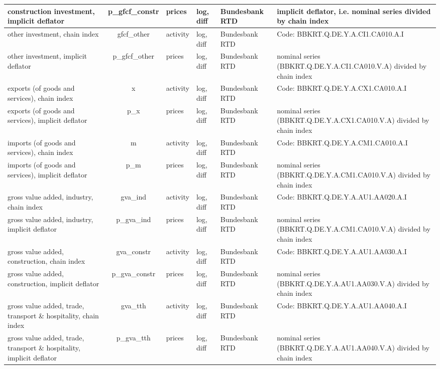 \documentclass[notitlepage,a4paper,12pt]{article}
\begin{document}
\begin{ThreePartTable}
\begin{landscape}
\begin{longtable}{| l | c | l | l | l | l |}
    construction investment, implicit deflator\tnote{s,c} & p\_gfcf\_constr & prices & log, diff  & Bundesbank RTD & implicit deflator, i.e. nominal series divided by chain index\\ \hline
    other investment, chain index\tnote{s,c} & gfcf\_other & activity & log, diff  & Bundesbank RTD & Code: BBKRT.Q.DE.Y.A.CI1.CA010.A.I\\ \hline
    other investment, implicit deflator\tnote{s,c} & p\_gfcf\_other & prices & log, diff  & Bundesbank RTD & nominal series (BBKRT.Q.DE.Y.A.CI1.CA010.V.A) divided by chain index\\ \hline
    exports (of goods and services), chain index\tnote{s,c} & x & activity & log, diff  & Bundesbank RTD & Code: BBKRT.Q.DE.Y.A.CX1.CA010.A.I\\ \hline
    exports (of goods and services), implicit deflator\tnote{s,c} & p\_x & prices & log, diff  & Bundesbank RTD & nominal series (BBKRT.Q.DE.Y.A.CX1.CA010.V.A) divided by chain index\\ \hline
    imports (of goods and services), chain index\tnote{s,c} & m & activity & log, diff  & Bundesbank RTD & Code: BBKRT.Q.DE.Y.A.CM1.CA010.A.I\\ \hline
    imports (of goods and services), implicit deflator\tnote{s,c} & p\_m & prices & log, diff  & Bundesbank RTD & nominal series (BBKRT.Q.DE.Y.A.CM1.CA010.V.A) divided by chain index\\ \hline
    gross value added, industry, chain index\tnote{s,c} & gva\_ind & activity & log, diff  & Bundesbank RTD & Code: BBKRT.Q.DE.Y.A.AU1.AA020.A.I\\ \hline
    gross value added, industry, implicit deflator\tnote{s,c} & p\_gva\_ind & prices & log, diff  & Bundesbank RTD & nominal series (BBKRT.Q.DE.Y.A.CM1.CA010.V.A) divided by chain index\\ \hline
    gross value added, construction, chain index\tnote{s,c} & gva\_constr & activity & log, diff  & Bundesbank RTD & Code: BBKRT.Q.DE.Y.A.AU1.AA030.A.I\\ \hline
    gross value added, construction, implicit deflator\tnote{s,c} & p\_gva\_constr & prices & log, diff  & Bundesbank RTD & nominal series (BBKRT.Q.DE.Y.A.AU1.AA030.V.A) divided by chain index\\ \hline    
    gross value added, trade, transport \& hospitality, chain index\tnote{s,c} & gva\_tth & activity & log, diff  & Bundesbank RTD & Code: BBKRT.Q.DE.Y.A.AU1.AA040.A.I\\ \hline
    gross value added, trade, transport \& hospitality, implicit deflator\tnote{s,c} & p\_gva\_tth & prices & log, diff  & Bundesbank RTD & nominal series (BBKRT.Q.DE.Y.A.AU1.AA040.V.A) divided by chain index\\ \hline   

\end{longtable}
\end{landscape}
\end{ThreePartTable}
\end{document}
